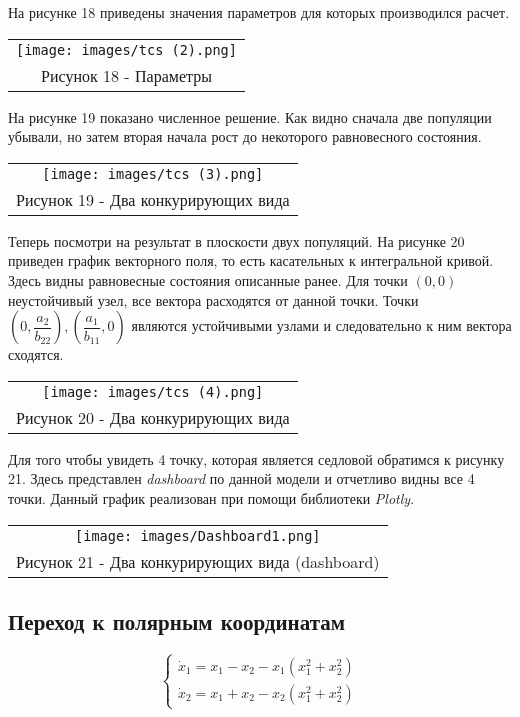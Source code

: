 На рисунке 18 приведены значения параметров для которых производился расчет.
\begin{center}
  \begin{tabular}{c}
    \texttt{[image: images/tcs (2).png]}\\
    Рисунок 18 - Параметры
  \end{tabular}
\end{center}

На рисунке 19 показано численное решение. Как видно сначала две популяции убывали, но затем вторая начала рост до некоторого равновесного состояния.
\begin{center}
  \begin{tabular}{c}
    \texttt{[image: images/tcs (3).png]}\\
    Рисунок 19 - Два конкурирующих вида
  \end{tabular}
\end{center}

Теперь посмотри на результат в плоскости двух популяций. На рисунке 20 приведен график векторного поля, то есть касательных к интегральной кривой. Здесь видны равновесные состояния описанные ранее. Для точки $(0,0)$ неустойчивый узел, все вектора расходятся от данной точки. Точки $(0,\dfrac{a_2}{b_{22}}),(\dfrac{a_1}{b_{11}},0)$ являются устойчивыми узлами и следовательно к ним вектора сходятся.
\begin{center}
  \begin{tabular}{c}
    \texttt{[image: images/tcs (4).png]}\\
    Рисунок 20 - Два конкурирующих вида
  \end{tabular}
\end{center}

Для того чтобы увидеть 4 точку, которая является седловой обратимся к рисунку 21. Здесь представлен \textit{dashboard} по данной модели и отчетливо видны все 4 точки. Данный график реализован при помощи библиотеки \textit{Plotly}.
\begin{center}
  \begin{tabular}{c}
    \texttt{[image: images/Dashboard1.png]}\\
    Рисунок 21 - Два конкурирующих вида (dashboard)
  \end{tabular}
\end{center}

\subsection{Переход к полярным координатам}
\begin{equation}
\begin{cases}
  \dot{x}_1=x_1-x_2-x_1(x_1^2+x_2^2)\\
  \dot{x}_2=x_1+x_2-x_2(x_1^2+x_2^2)
\end{cases}
\end{equation}

